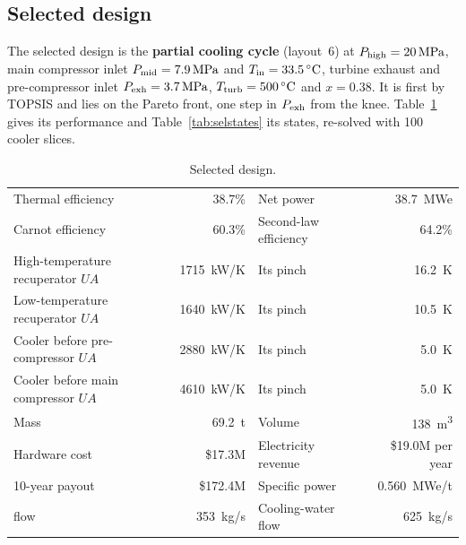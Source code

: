 
\subsection{Selected design}
The selected design is the \textbf{partial cooling cycle} (layout~6) at $P_\mathrm{high} = \SI{20}{MPa}$, main compressor inlet $P_\mathrm{mid} = \SI{7.9}{MPa}$ and $T_\mathrm{in} = \SI{33.5}{\celsius}$, turbine exhaust and pre-compressor inlet $P_\mathrm{exh} = \SI{3.7}{MPa}$, $T_\mathrm{turb} = \SI{500}{\celsius}$ and $x = 0.38$. It is first by TOPSIS and lies on the Pareto front, one step in $P_\mathrm{exh}$ from the knee. Table~\ref{tab:selected} gives its performance and Table~\ref{tab:selstates} its states, re-solved with 100 cooler slices.

\begin{table}[h]\centering\small
\begin{tabular}{@{}lr@{\qquad}lr@{}}
\toprule
Thermal efficiency & 38.7\% & Net power & \SI{38.7}{MWe}\\
Carnot efficiency & 60.3\% & Second-law efficiency & 64.2\%\\
High-temperature recuperator $UA$ & \SI{1715}{kW/K} & Its pinch & \SI{16.2}{K}\\
Low-temperature recuperator $UA$ & \SI{1640}{kW/K} & Its pinch & \SI{10.5}{K}\\
Cooler before pre-compressor $UA$ & \SI{2880}{kW/K} & Its pinch & \SI{5.0}{K}\\
Cooler before main compressor $UA$ & \SI{4610}{kW/K} & Its pinch & \SI{5.0}{K}\\
Mass & \SI{69.2}{t} & Volume & \SI{138}{m^3}\\
Hardware cost & \$17.3M & Electricity revenue & \$19.0M per year\\
10-year payout & \$172.4M & Specific power & \SI{0.560}{MWe/t}\\
\cotwo{} flow & \SI{353}{kg/s} & Cooling-water flow & \SI{625}{kg/s}\\
\bottomrule
\end{tabular}
\caption{Selected design.}\label{tab:selected}
\end{table}

